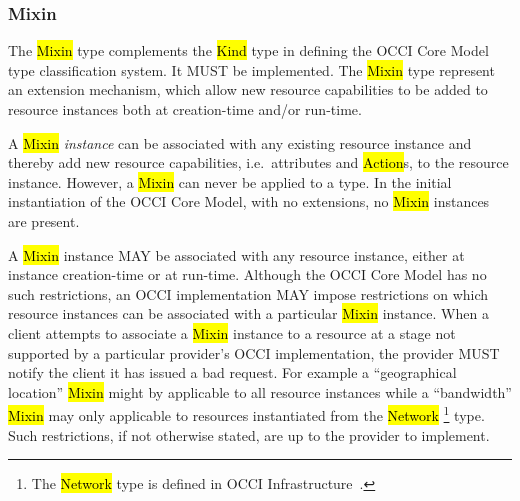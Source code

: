 \documentclass[10pt,a4paper]{article}
\begin{document}
\subsubsection{Mixin}
The \hl{Mixin} type complements the \hl{Kind} type in defining the
OCCI Core Model type classification system. It MUST be implemented. The \hl{Mixin}
type represent an extension mechanism, which allow new resource capabilities to
be added to resource instances both at creation-time and/or run-time.

A \hl{Mixin} {\em instance} can be associated with any existing resource
instance and thereby add new resource capabilities, i.e.~attributes and
\hl{Action}s, to the resource instance. However, a \hl{Mixin} can never be
applied to a type.
In the initial instantiation of the OCCI Core Model, with no extensions, no
\hl{Mixin} instances are present.

A \hl{Mixin} instance MAY be associated with any resource instance, either at
instance creation-time or at run-time. Although the OCCI Core Model has no such
restrictions, an OCCI implementation MAY impose restrictions on which resource
instances can be associated with a particular \hl{Mixin} instance.
%
When a client attempts to associate a \hl{Mixin} instance to a resource at a
stage not supported by a particular provider's OCCI implementation, the
provider MUST notify the client it has issued a bad request.
%
For example a ``geographical location'' \hl{Mixin} might by applicable to all
resource instances while a ``bandwidth'' \hl{Mixin} may only applicable
to resources instantiated from the \hl{Network}%
\footnote{The \hl{Network} type is defined in OCCI Infrastructure~\cite{occi:infrastructure}.}
type. Such restrictions, if not otherwise stated, are up to the provider to
implement.
\end{document}

